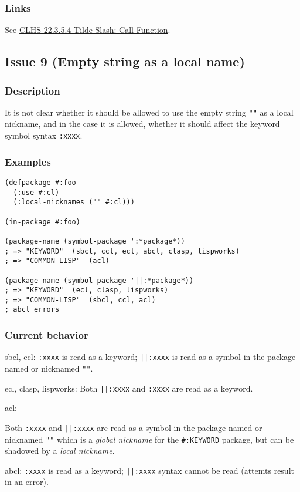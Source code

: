 \documentclass[11pt]{article}
\begin{document}
\subsubsection{Links}
\label{sec:orgd98ffbb}
See \href{https://www.lispworks.com/documentation/HyperSpec/Body/22\_ced.htm}{CLHS 22.3.5.4 Tilde Slash: Call Function}.
\subsection{Issue 9 (Empty string as a local name)}
\label{sec:orgc853258}
\subsubsection{Description}
\label{sec:org9d4d6d0}
It is not clear whether it should be allowed to use the empty string \texttt{""} as a
local nickname, and in the case it is allowed, whether it should affect the
keyword symbol syntax \texttt{:xxxx}.
\subsubsection{Examples}
\label{sec:orgf43f007}
\begin{verbatim}
(defpackage #:foo
  (:use #:cl)
  (:local-nicknames ("" #:cl)))

(in-package #:foo)

(package-name (symbol-package ':*package*))
; => "KEYWORD"  (sbcl, ccl, ecl, abcl, clasp, lispworks)
; => "COMMON-LISP"  (acl)

(package-name (symbol-package '||:*package*))
; => "KEYWORD"  (ecl, clasp, lispworks)
; => "COMMON-LISP"  (sbcl, ccl, acl)
; abcl errors
\end{verbatim}
\subsubsection{Current behavior}
\label{sec:org4417b89}
sbcl, ccl:
\texttt{:xxxx} is read as a keyword;
\texttt{||:xxxx} is read as a symbol in the package named or nicknamed \texttt{""}.

ecl, clasp, lispworks:
Both \texttt{||:xxxx} and \texttt{:xxxx} are read as a keyword.

acl:

Both \texttt{:xxxx} and \texttt{||:xxxx} are read as a symbol in the package named or nicknamed
\texttt{""} which is a \emph{global nickname} for the \texttt{\#:KEYWORD} package, but can be shadowed
by a \emph{local nickname}.

abcl:
\texttt{:xxxx} is read as a keyword;
\texttt{||:xxxx} syntax cannot be read (attemts result in an error).
\end{document}
